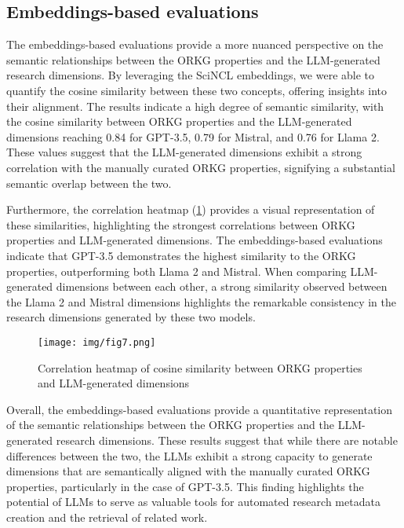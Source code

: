 \subsection{Embeddings-based evaluations}

The embeddings-based evaluations provide a more nuanced perspective on the semantic relationships between the ORKG properties and the LLM-generated research dimensions. By leveraging the SciNCL embeddings, we were able to quantify the cosine similarity between these two concepts, offering insights into their alignment. The results indicate a high degree of semantic similarity, with the cosine similarity between ORKG properties and the LLM-generated dimensions reaching 0.84 for GPT-3.5, 0.79 for Mistral, and 0.76 for Llama 2. These values suggest that the LLM-generated dimensions exhibit a strong correlation with the manually curated ORKG properties, signifying a substantial semantic overlap between the two.

Furthermore, the correlation heatmap (\ref{figure Correlation Heatmap}) provides a visual representation of these similarities, highlighting the strongest correlations between ORKG properties and LLM-generated dimensions. The embeddings-based evaluations indicate that GPT-3.5 demonstrates the highest similarity to the ORKG properties, outperforming both Llama 2 and Mistral. When comparing LLM-generated dimensions between each other, a strong similarity observed between the Llama 2 and Mistral dimensions highlights the remarkable consistency in the research dimensions generated by these two models. 

\begin{figure}[!htb]
\texttt{[image: img/fig7.png]}
\caption{Correlation heatmap of cosine similarity between ORKG properties and LLM-generated dimensions\label{figure Correlation Heatmap}}
\end{figure} 

Overall, the embeddings-based evaluations provide a quantitative representation of the semantic relationships between the ORKG properties and the LLM-generated research dimensions. These results suggest that while there are notable differences between the two, the LLMs exhibit a strong capacity to generate dimensions that are semantically aligned with the manually curated ORKG properties, particularly in the case of GPT-3.5. This finding highlights the potential of LLMs to serve as valuable tools for automated research metadata creation and the retrieval of related work.

